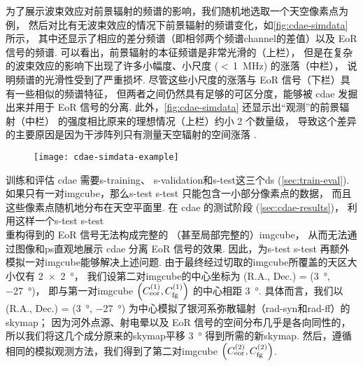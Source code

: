 为了展示波束效应对前景辐射的频谱的影响，我们随机地选取一个天空像素点为例，
然后对比有无波束效应的情况下前景辐射的频谱变化，如\autoref{fig:cdae-simdata} 所示，
其中还显示了相应的差分频谱（即相邻两个频谱\ac{channel}的差值）以及 EoR 信号的频谱.
可以看出，前景辐射的本征频谱是非常光滑的（上栏），
但是在复杂的波束效应的影响下出现了许多小幅度、小尺度 ($<$\,\SI{1}{\MHz}) 的涨落（中栏），
说明频谱的光滑性受到了严重损坏.
尽管这些小尺度的涨落与 EoR 信号（下栏）具有一些相似的频谱特征，
但两者之间仍然具有足够的可区分度，能够被 \ac{cdae} 发掘出来并用于 EoR 信号的分离.
此外，\autoref{fig:cdae-simdata} 还显示出\enquote{观测}的前景辐射（中栏）
的强度相比原来的理想情况（上栏）约小 2 个数量级，
导致这个差异的主要原因是因为干涉阵列只有测量天空辐射的空间涨落 \cite{braun1985}.

\begin{figure}[htp]
  \centering
  \texttt{[image: cdae-simdata-example]}
  \label{fig:cdae-simdata}
\end{figure}

训练和评估 \ac{cdae} 需要\acl{s-training}、
\acl{s-validation}和\acl{s-test}这三个\ac{ds} (\autoref{sec:train-eval}).
如果只有一对\ac{imgcube}，那么\acl{s-test} \ac{s-test} 只能包含一小部分像素点的数据，
而且这些像素点随机地分布在天空平面里.
在 \ac{cdae} 的测试阶段 (\autoref{sec:cdae-results})，
利用这样一个\acl{s-test} \ac{s-test} 重构得到的 EoR 信号无法构成完整的
（甚至局部完整的）\ac{imgcube}，
从而无法通过图像和\ac{ps}直观地展示 \ac{cdae} 分离 EoR 信号的效果.
因此，为\acl{s-test} \ac{s-test} 再额外模拟一对\ac{imgcube}能够解决上述问题.
由于最终经过切取的\ac{imgcube}所覆盖的天区大小仅有 \SI{2 x 2}{\degree}，
我们设第二对\ac{imgcube}的中心坐标为
(R.A., Dec.\@) = (\SI{3}{\degree}, \SI{-27}{\degree})，
即与第一对\ac{imgcube}
$\left( C_{\mathrm{eor}}^{(1)}, C_{\mathrm{fg}}^{(1)} \right)$
的中心相距 \SI{3}{\degree}.
具体而言，我们以 (R.A., Dec.\@) = (\SI{3}{\degree}, \SI{-27}{\degree})
为中心模拟了银河系弥散辐射（\ac{rad-syn}和\ac{rad-ff}）的\ac{skymap}；
因为河外点源、射电晕以及 EoR 信号的空间分布几乎是各向同性的，
所以我们将这几个成分原来的\ac{skymap}平移 \SI{3}{\degree} 得到所需的新\ac{skymap}.
然后，遵循相同的模拟观测方法，我们得到了第二对\ac{imgcube}
$\left( C_{\mathrm{eor}}^{(2)}, C_{\mathrm{fg}}^{(2)} \right)$.

